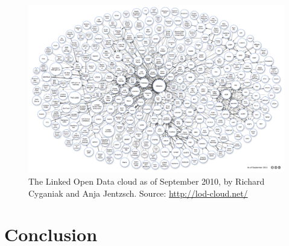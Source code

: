 \begin{figure}[htbp!]
\begin{center}
  \includegraphics[width=1.0\textwidth]{lod-cloud.png}    
  \caption[The Linked Open Data cloud as of September 2010.]{The Linked Open Data cloud as of September 2010, by Richard Cyganiak and Anja Jentzsch. Source: \url{http://lod-cloud.net/}}    
  \label{fig:lod-cloud}
  \end{center}  
\end{figure}

\section{Conclusion}